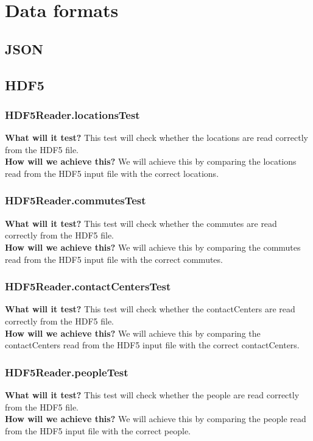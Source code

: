 \documentclass{article}
\begin{document}
\section{Data formats}
\subsection{JSON}
\subsection{HDF5}
\subsubsection{HDF5Reader.locationsTest}
\textbf{What will it test?}
This test will check whether the locations are read correctly from the HDF5 file. \\
\newline
\textbf{How will we achieve this?}
We will achieve this by comparing the locations read from the HDF5 input file with the correct locations.

\subsubsection{HDF5Reader.commutesTest}
\textbf{What will it test?}
This test will check whether the commutes are read correctly from the HDF5 file. \\
\newline
\textbf{How will we achieve this?}
We will achieve this by comparing the commutes read from the HDF5 input file with the correct commutes.

\subsubsection{HDF5Reader.contactCentersTest}
\textbf{What will it test?}
This test will check whether the contactCenters are read correctly from the HDF5 file. \\
\newline
\textbf{How will we achieve this?}
We will achieve this by comparing the contactCenters read from the HDF5 input file with the correct contactCenters.

\subsubsection{HDF5Reader.peopleTest}
\textbf{What will it test?}
This test will check whether the people are read correctly from the HDF5 file. \\
\newline
\textbf{How will we achieve this?}
We will achieve this by comparing the people read from the HDF5 input file with the correct people.
\end{document}
